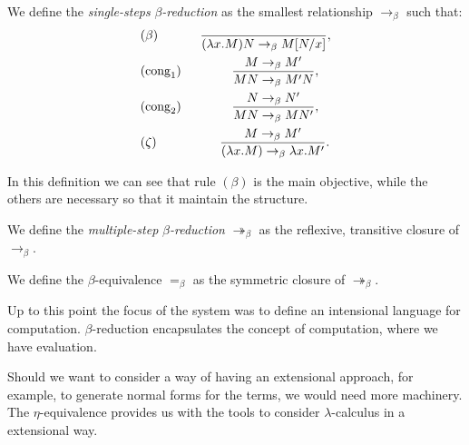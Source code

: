 \begin{definition}
  We define the \emph{single-steps} $\beta$\emph{-reduction} as the smallest relationship $\to_\beta$ such that:%
  \begin{align*}
    &(\beta) \qquad\ \ \  \ {\ \over(\lambda x.M)N \to_\beta M[N/x]},\\
    &(\operatorname{cong}_1)\qquad\qquad{ M \to_\beta M' \over MN \to_\beta M'N },\\
    &(\operatorname{cong}_2)\qquad\qquad{ N \to_\beta N' \over MN \to_\beta MN' },\\
    &(\zeta) \qquad\qquad \ \  \ {M\to_\beta M' \over(\lambda x.M) \to_\beta \lambda x.M'}.\\
  \end{align*}
\end{definition}

\begin{remark}
  In this definition we can see that rule $(\beta)$ is the main objective, while the others are necessary so that it maintain the structure.
\end{remark}
\begin{definition}
  We define the \emph{multiple-step} $\beta$\emph{-reduction} $\twoheadrightarrow_\beta$ as the reflexive, transitive closure of $\to_\beta$.
\end{definition}
\begin{definition}
  We define the $\beta$-equivalence $=_\beta$ as the symmetric closure of $\twoheadrightarrow_\beta$.
\end{definition}

Up to this point the focus of the system was to define an intensional language for computation. $\beta$-reduction encapsulates the concept of computation, where we have evaluation.



Should we want to consider a way of having an extensional approach, for example, to generate normal forms for the terms, we would need more machinery. The $\eta$-equivalence provides us with the tools to consider $\lambda$-calculus in a extensional way. \\

